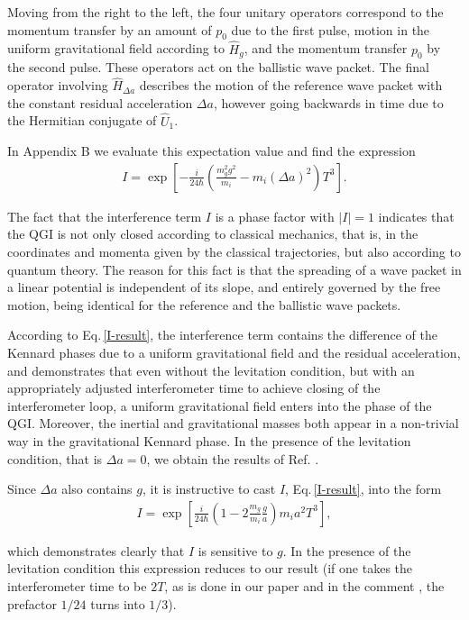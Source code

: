 \documentclass[aps,prx,onecolumn,superscriptaddress,longbibliography]{revtex4-2}
\begin{document}
Moving from the right to the left, the four unitary operators correspond to the momentum transfer by an amount of $p_0$ due to the first pulse, motion in the uniform gravitational field according to $\hat{H}_g$, and the momentum transfer $p_0$ by the second pulse. These operators act on the ballistic wave packet. The final operator involving $\hat{H}_{\Delta a}$ describes the motion of the reference wave packet with the constant residual acceleration $\Delta a$, however going backwards in time due to the Hermitian conjugate of $\hat{U}_1$.


In Appendix B we evaluate this expectation value and find the expression
\begin{align}
    I =\exp\left[-\frac{i}{24\hbar}\left(\frac{m_g^2 g^2}{m_i}- m_i(\Delta a)^2\right)T^3\right].
    \label{I-result}
\end{align}

The fact that the interference term $I$ is a phase factor with $|I|=1$ indicates that the QGI is not only closed according to classical mechanics, that is, in the coordinates and momenta given by the classical trajectories, but also according to quantum theory. The reason for this fact is that the spreading of a wave packet in a linear potential is independent of its slope, and entirely governed by the free motion, being identical for the reference and the ballistic wave packets.

According to Eq.\,\eqref{I-result}, the interference term contains the difference of the Kennard phases due to a uniform gravitational field and the residual acceleration, and demonstrates that even without the levitation condition, but with an appropriately adjusted interferometer time to achieve closing of the interferometer loop, a uniform gravitational field enters into the phase of the QGI. Moreover, the inertial and gravitational masses both appear in a non-trivial way in the gravitational Kennard phase. In the presence of the levitation condition, that is $\Delta a = 0$, we obtain the results of Ref. \cite{QGI}.

Since $\Delta a$ also contains $g$, it is instructive to cast $I$, Eq.\,\eqref{I-result}, into the form
\begin{align}
    I =\exp\left[\frac{i}{24\hbar}\left(1-2\frac{m_g}{m_i}\frac{g}{a}\right)m_i a^2T^3\right],
    \label{I-result2}
\end{align}

which demonstrates clearly that $I$ is sensitive to $g$. In the presence of the levitation condition this expression reduces to our result \cite{QGI} (if one takes the interferometer time to be $2T$, as is done in our paper \cite{QGI} and in the comment \cite{QGI-comment}, the prefactor $1/24$ turns into $1/3$).
\end{document}
